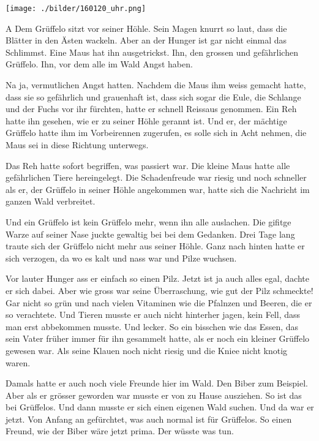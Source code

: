 \thispagestyle{empty}
\begin{center}
\texttt{[image: ./bilder/160120\_uhr.png]}
\end{center}
\vskip 2cm
{\Huge\color{farbe}\hfill{\tt{}}}
\newpage
\lettrine[lines=2, lhang=.2, loversize=.25, lraise=0.05, findent=0.1em,
nindent=0em]{A}{}
Dem Grüffelo sitzt vor seiner Höhle. Sein Magen knurrt so laut, dass die Blätter in den Ästen wackeln. Aber an der Hunger ist gar nicht einmal das Schlimmst. Eine Maus hat ihn ausgetrickst. Ihn, den grossen und gefährlichen Grüffelo. Ihn, vor dem alle im Wald Angst haben. 

Na ja, vermutlichen Angst hatten. Nachdem die Maus ihm weiss gemacht hatte, dass sie so gefährlich und grauenhaft ist, dass sich sogar die Eule, die Schlange und der Fuchs vor ihr fürchten, hatte er schnell Reissaus genommen. Ein Reh hatte ihn gesehen, wie er zu seiner Höhle gerannt ist. Und er, der mächtige Grüffelo hatte ihm im Vorbeirennen zugerufen, es solle sich in Acht nehmen, die Maus sei in diese Richtung unterwegs. 

Das Reh hatte sofort begriffen, was passiert war. Die kleine Maus hatte alle gefährlichen Tiere hereingelegt. Die Schadenfreude war riesig und noch schneller als er, der Grüffelo in seiner Höhle angekommen war, hatte sich die Nachricht im ganzen Wald verbreitet. 

Und ein Grüffelo ist kein Grüffelo mehr, wenn ihn alle auslachen. Die gifitge Warze auf seiner Nase juckte gewaltig bei bei dem Gedanken. Drei Tage lang traute sich der Grüffelo nicht mehr aus seiner Höhle. Ganz nach hinten hatte er sich verzogen, da wo es kalt und nass war und Pilze wuchsen.

Vor lauter Hunger ass er einfach so einen Pilz. Jetzt ist ja auch alles egal, dachte er sich dabei. Aber wie gross war seine Überraschung, wie gut der Pilz schmeckte! Gar nicht so grün und nach vielen Vitaminen wie die Pfalnzen und Beeren, die er so verachtete. Und Tieren musste er auch nicht hinterher jagen, kein Fell, dass man erst abbekommen musste. Und lecker. So ein bisschen wie das Essen, das sein Vater früher immer für ihn gesammelt hatte, als er noch ein kleiner Grüffelo gewesen war. Als seine Klauen noch nicht riesig und die Kniee nicht knotig waren. 

Damals hatte er auch noch viele Freunde hier im Wald. Den Biber zum Beispiel. Aber als er grösser geworden war musste er von zu Hause ausziehen. So ist das bei Grüffelos. Und dann musste er sich einen eigenen Wald suchen. Und da war er jetzt. Von Anfang an gefürchtet, was auch normal ist für Grüffelos. So einen Freund, wie der Biber wäre jetzt prima. Der wüsste was tun. 



\vfill
